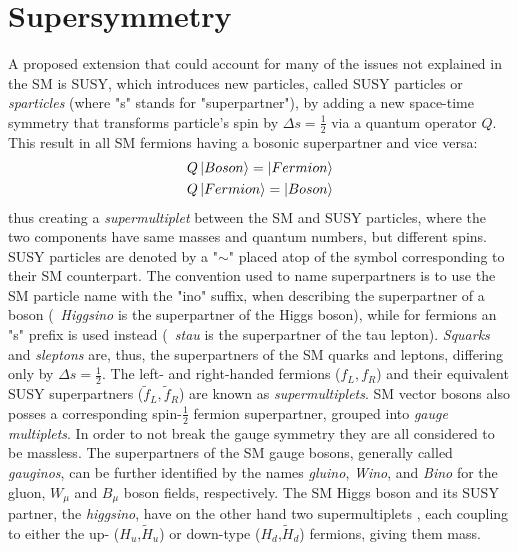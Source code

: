 %	
	
	
	\section{Supersymmetry}\label{sec:SUSY}
	A proposed extension that could account for many of the issues not explained in the \ac{SM} is \ac{SUSY}, which introduces new particles, called \ac{SUSY} particles or \textit{sparticles} (where "s" stands for "superpartner"), by adding a new space-time symmetry that transforms particle's spin by $\Delta s =\frac{1}{2}$ via a quantum operator $Q$. 
	This result in all \ac{SM} fermions having a bosonic superpartner and vice versa:
	\begin{equation}
	\begin{split}
	&Q\ket{Boson} = \ket{Fermion} \\
	&Q\ket{Fermion} = \ket{Boson}
	\end{split}
	\end{equation}
	thus creating a \textit{supermultiplet} between the \ac{SM} and \ac{SUSY} particles, where the two components have same masses and quantum numbers, but different spins. 
	\ac{SUSY} particles are denoted by a "$\sim$" placed atop of the symbol corresponding to their \ac{SM} counterpart.
	 The convention used to name superpartners is to use the \ac{SM} particle name with the "ino" suffix, when describing the superpartner of a boson (\eg\ \textit{Higgsino} is the superpartner of the Higgs boson), while for fermions an "s" prefix is used instead (\eg\ \textit{stau} is the superpartner of the tau lepton).
	\textit{Squarks} and \textit{sleptons} are, thus, the superpartners of the \ac{SM} quarks and leptons, differing only by $\Delta s =\frac{1}{2}$. The left- and right-handed fermions ($f_L,f_R$) and their equivalent \ac{SUSY} superpartners ($\tilde{f}_L,\tilde{f}_R$) are known as \textit{supermultiplets}.
	\ac{SM} vector bosons also posses a corresponding spin-$\frac{1}{2}$ fermion superpartner, grouped into \textit{gauge multiplets}. In order to not break the gauge symmetry they are all considered to be massless. The superpartners of the \ac{SM} gauge bosons, generally called \textit{gauginos}, can be further identified by the names \textit{gluino}, \textit{Wino}, and \textit{Bino} for the gluon, $W_{\mu}$ and $B_{\mu}$ boson fields, respectively.
	The \ac{SM} Higgs boson and its \ac{SUSY} partner, the \textit{higgsino}, have on the other hand two supermultiplets , each coupling to either the up-  ($H_u$,$\tilde{H}_u$) or down-type ($H_d$,$\tilde{H}_d$) fermions, giving them mass.

